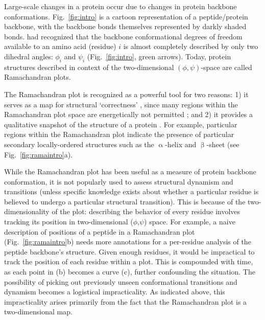 \documentclass[fleqn,10pt,lineno]{wlpeerj} %
\newcommand{\Fig}[1]{Fig.~\ref{#1}}
\begin{document}
Large-scale changes in a protein occur due to changes in protein backbone conformations. %
\Fig{fig:intro} is a cartoon representation of a peptide/protein backbone, with the backbone bonds themselves represented by darkly shaded bonds. \cite{Ramachandran1963} had recognized that the backbone conformational degrees of freedom available to an amino acid (residue) $i$ is almost completely described by only two dihedral angles: $\phi_i$ and $\psi_i$ (\Fig{fig:intro}, green arrows). %
Today, protein structures described in context of the two-dimensional $(\phi,\psi)$-space are called Ramachandran plots.

The Ramachandran plot is recognized as a powerful tool for two reasons: 1) it serves as a map for structural `correctness' \citep{Laskowski1993,Hooft1997,Laskowski2003}, since many regions within the Ramachandran plot space are energetically not permitted \citep{Momen2017}; and 2) it provides a qualitative snapshot of the structure of a protein \citep{Berg2006,Alberts2002,Subramanian2001}. For example, particular regions within the Ramachandran plot indicate the presence of particular secondary locally-ordered structures such as the $\upalpha$-helix and $\upbeta$-sheet (see \Fig{fig:ramaintro}a).

While the Ramachandran plot has been useful as a measure of protein backbone conformation, it is not popularly used to assess structural dynamism and transitions (unless specific knowledge exists about whether a particular residue is believed to undergo a particular structural transition). This is because of the two-dimensionality of the plot: describing the behavior of every residue involves tracking its position in two-dimensional ($\phi$,$\psi$) space. For example, a naive description of positions of a peptide in a Ramachandran plot (\Fig{fig:ramaintro}b) needs more annotations for a per-residue analysis of the peptide backbone's structure. Given enough residues, it would be impractical to track the position of each residue within a plot. This is compounded with time, as each point in (b) becomes a curve (c), further confounding the situation. The possibility of picking out previously unseen conformational transitions and dynamism becomes a logistical impracticality. As indicated above, this impracticality arises primarily from the fact that the Ramachandran plot is a two-dimensional map.
\end{document}
